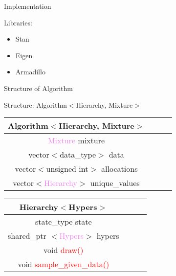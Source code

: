 \begin{frame}{Implementation}

Libraries:
\begin{itemize}
		\item Stan
		\item Eigen
		\item Armadillo
\end{itemize}
\end{frame}

\begin{frame}{Structure of Algorithm}

Structure:
 Algorithm$<$Hierarchy, Mixture$>$
\begin{center}
\begin{tabular}{ |c|c|c|c| } 
\hline
 Algorithm$<$Hierarchy, Mixture$>$ \\
\hline
 \textcolor{violet}{Mixture} mixture\\
 vector$<$data\_type$>$ data  \\ 
 vector$<$unsigned int$>$ allocations  \\
 vector$<$\textcolor{violet}{Hierarchy}$>$ unique\_values \\
\hline
\end{tabular}
\end{center}



\begin{center}
\begin{tabular}{ |c|c|c|c| } 
\hline
Hierarchy$<$Hypers$>$ \\
\hline
 state\_type state  \\ 
 shared\_ptr $<$\textcolor{violet}{Hypers}$>$ hypers \\
 void \textcolor{red}{draw()} \\
 void \textcolor{red}{sample\_given\_data()} \\
\hline
\end{tabular}
\end{center}

	
\end{frame}



